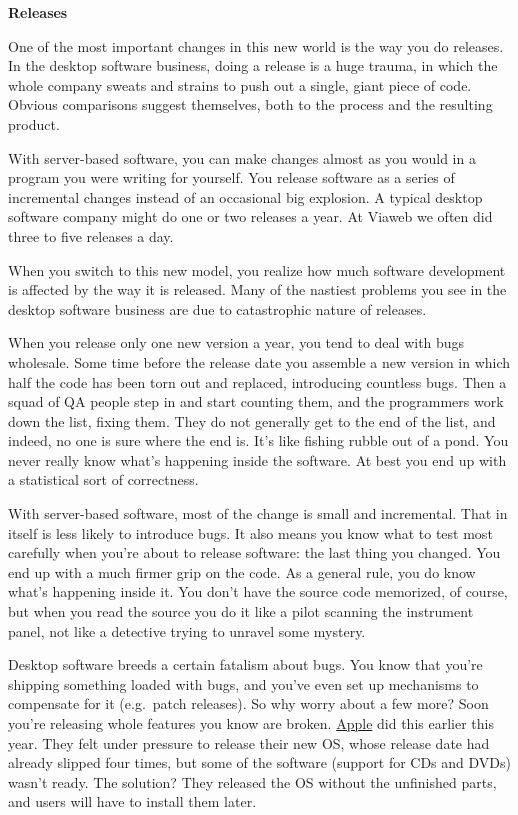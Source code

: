 \textbf{Releases}

One of the most important changes in this new world is the way you do
releases. In the desktop software business, doing a release is a huge
trauma, in which the whole company sweats and strains to push out a
single, giant piece of code. Obvious comparisons suggest themselves,
both to the process and the resulting product.

With server-based software, you can make changes almost as you would in
a program you were writing for yourself. You release software as a
series of incremental changes instead of an occasional big explosion. A
typical desktop software company might do one or two releases a year. At
Viaweb we often did three to five releases a day.

When you switch to this new model, you realize how much software
development is affected by the way it is released. Many of the nastiest
problems you see in the desktop software business are due to
catastrophic nature of releases.

When you release only one new version a year, you tend to deal with bugs
wholesale. Some time before the release date you assemble a new version
in which half the code has been torn out and replaced, introducing
countless bugs. Then a squad of QA people step in and start counting
them, and the programmers work down the list, fixing them. They do not
generally get to the end of the list, and indeed, no one is sure where
the end is. It's like fishing rubble out of a pond. You never really
know what's happening inside the software. At best you end up with a
statistical sort of correctness.

With server-based software, most of the change is small and incremental.
That in itself is less likely to introduce bugs. It also means you know
what to test most carefully when you're about to release software: the
last thing you changed. You end up with a much firmer grip on the code.
As a general rule, you do know what's happening inside it. You don't
have the source code memorized, of course, but when you read the source
you do it like a pilot scanning the instrument panel, not like a
detective trying to unravel some mystery.

Desktop software breeds a certain fatalism about bugs. You know that
you're shipping something loaded with bugs, and you've even set up
mechanisms to compensate for it (e.g.~patch releases). So why worry
about a few more? Soon you're releasing whole features you know are
broken. \href{http://news.cnet.com/news/0-1006-200-5195914.html}{Apple}
did this earlier this year. They felt under pressure to release their
new OS, whose release date had already slipped four times, but some of
the software (support for CDs and DVDs) wasn't ready. The solution? They
released the OS without the unfinished parts, and users will have to
install them later.

